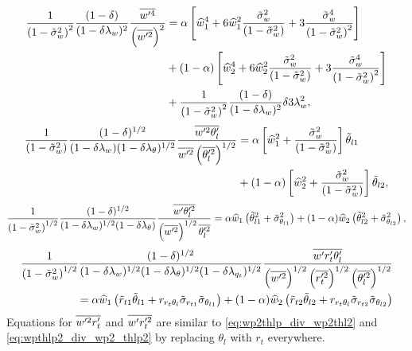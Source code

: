 \begin{align}
    \label{eq:wp4_div_wp2_2}
    \frac{1}{\left( 1 - \tilde{\sigma}_w^2 \right)^2} \frac{(1-\delta)}{(1-\delta \lambda_w)^2} \frac{\overline{w'^4}}{\left(\overline{w'^2} \right)^2}
    &= \alpha \left[\widehat{w}_1^4 +
    6 \widehat{w}_1^2 \frac{{\tilde{\sigma}_w}^2}{\left( 1 - \tilde{\sigma}_w^2 \right)} +
    3 \frac{{\tilde{\sigma}_w}^4}{\left( 1 - \tilde{\sigma}_w^2 \right)^2} \right] \nonumber \\
    &+ (1 - \alpha) \left[\widehat{w}_2^4 +
    6 \widehat{w}_2^2 \frac{{\tilde{\sigma}_w}^2}{\left( 1 - \tilde{\sigma}_w^2 \right)} +
    3 \frac{{\tilde{\sigma}_w}^4}{\left( 1 - \tilde{\sigma}_w^2 \right)^2} \right] \nonumber \\
    &+ \frac{1}{\left( 1 - \tilde{\sigma}_w^2 \right)^2} \frac{(1-\delta)}{(1-\delta \lambda_w)^2} \delta 3 \lambda_w^2,
\end{align}
\begin{align}
    \label{eq:wp2thlp_div_wp2thl2}
    \frac{1}{\left( 1 - \tilde{\sigma}_w^2 \right)} \frac{(1-\delta)^{1/2}}{(1-\delta \lambda_w) (1-\delta \lambda_\theta)^{1/2}}
    \frac{\overline{w'^2 \theta_l'}}{\overline{w'^2} \left(\overline{\theta_l'^2} \right)^{1/2}}
    &= \alpha \left[\widehat{w}_1^2 + \frac{{\tilde{\sigma}_w}^2}{\left( 1 - \tilde{\sigma}_w^2 \right)} \right] \tilde{\theta}_{l1} \nonumber\\
    &+ (1-\alpha) \left[\widehat{w}_2^2 + \frac{{\tilde{\sigma}_w}^2}{\left( 1 - \tilde{\sigma}_w^2 \right)}\right] \tilde{\theta}_{l2},
\end{align}
\begin{align}
    \label{eq:wpthlp2_div_wp2_thlp2}
    \frac{1}{\left( 1 - \tilde{\sigma}_w^2 \right)^{1/2}} \frac{(1-\delta)^{1/2}}{(1-\delta \lambda_w)^{1/2} (1-\delta \lambda_\theta)}
    \frac{\overline{w' \theta_l'^2}}{\left(\overline{w'^2}\right)^{1/2}\overline{\theta_l'^2}}
    = \alpha  \widehat{w}_1  \left( \tilde{\theta}_{l1}^2 + \tilde{\sigma}_{\theta_{l1}}^2 \right)
    + (1-\alpha) \widehat{w}_2 \left( \tilde{\theta}_{l2}^2 + \tilde{\sigma}_{\theta_{l2}}^2 \right),
\end{align}
\begin{align}
    \label{eq:wprtpthlp_div_wp2_thp2_rt2}
    \frac{1}{\left( 1 - \tilde{\sigma}_w^2 \right)^{1/2}}
    \frac{(1-\delta)^{1/2}}
    {(1-\delta \lambda_w)^{1/2} (1-\delta \lambda_\theta)^{1/2}(1-\delta \lambda_{q_t})^{1/2}}
    \frac{\overline{w' r_t' \theta_l'}}
    {\left( \overline{w'^2} \right)^{1/2}\left(\overline{r_t'^2} \right)^{1/2} \left( \overline{\theta_l'^2} \right)^{1/2}} \nonumber \\
    = \alpha \widehat{w}_1 \left(\tilde{r}_{t1} \tilde{\theta}_{l1} +
    r_{r_t \theta_l} \tilde{\sigma}_{r_{t1}} \tilde{\sigma}_{\theta_{l1}} \right) +
    (1-\alpha) \widehat{w}_2 \left(\tilde{r}_{t2} \tilde{\theta}_{l2} +
    r_{r_t \theta_l} \tilde{\sigma}_{r_{t2}} \tilde{\sigma}_{\theta_{l2}} \right)
\end{align}
Equations for $\overline{w'^2 r_t'}$ and $\overline{w' r_t'^2}$ are similar to \cref{eq:wp2thlp_div_wp2thl2}
and \cref{eq:wpthlp2_div_wp2_thlp2} by replacing $\theta_l$ with $r_t$ everywhere.